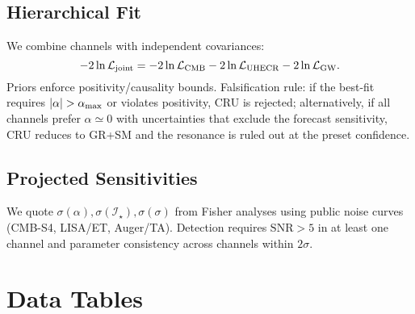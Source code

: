 \documentclass[12pt,a4paper,oneside]{scrbook}
\theoremstyle{definition}
\theoremstyle{remark}
\begin{document}
\section{Hierarchical Fit}
\label{sec:hierfit}
We combine channels with independent covariances:
\begin{equation}
-2\ln\mathcal{L}_{\rm joint} = -2\ln\mathcal{L}_{\rm CMB} -2\ln\mathcal{L}_{\rm UHECR} -2\ln\mathcal{L}_{\rm GW}.
\end{equation}
Priors enforce positivity/causality bounds. Falsification rule: if the best-fit requires $|\alpha|>\alpha_{\rm max}$ or violates positivity, CRU is rejected; alternatively, if all channels prefer $\alpha\simeq 0$ with uncertainties that exclude the forecast sensitivity, CRU reduces to GR+SM and the resonance is ruled out at the preset confidence.
\section{Projected Sensitivities}
\label{sec:projections}
We quote $\sigma(\alpha),\sigma(\mathcal{I}_\star),\sigma(\sigma)$ from Fisher analyses using public noise curves (CMB-S4, LISA/ET, Auger/TA). Detection requires $\mathrm{SNR}>5$ in at least one channel and parameter consistency across channels within $2\sigma$.
\chapter{Data Tables}
\label{chap:data}
\end{document}
